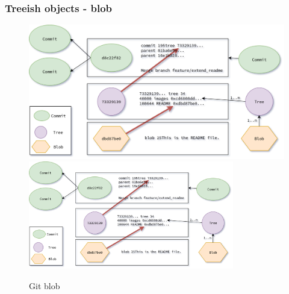 \begin{frame}
    \frametitle{Treeish objects - blob}
    \begin{figure}
        \begin{center}
            {
                \includegraphics[height=0.70\textheight,keepaspectratio]{./images/Treeish_Blob.png}
            }
            {
                \includegraphics[height=0.6\textheight,width=0.8\textwidth]{./images/Treeish_Blob.png}
            }
            \caption{Git blob}
        \end{center}
    \end{figure}
\end{frame}

